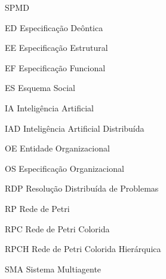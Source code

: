 \begin{listofabbrv}{SPMD}
  \item[ED] Especificação Deôntica
  \item[EE] Especificação Estrutural
  \item[EF] Especificação Funcional
  \item[ES] Esquema Social
  \item[IA] Inteligência Artificial
  \item[IAD] Inteligência Artificial Distribuída
  \item[OE] Entidade Organizacional
  \item[OS] Especificação Organizacional
  \item[RDP] Resolução Distribuída de Problemas
  \item[RP] Rede de Petri
  \item[RPC] Rede de Petri Colorida
  \item[RPCH] Rede de Petri Colorida Hierárquica
  \item[SMA] Sistema Multiagente
\end{listofabbrv}